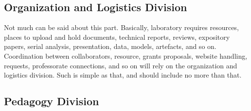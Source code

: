 \documentclass[9pt,a4paper]{article}
\begin{document}
\subsection{Organization and Logistics Division}

Not much can be said about this part. Basically, laboratory requires resources, places to upload and hold documents, technical reports, reviews, expository papers, serial analysis, presentation, data, models, artefacts, and so on. Coordination between collaborators, resource, grants proposals, website handling, requests, professorate connections, and so on will rely on the organization and logistics division. Such is simple as that, and should include no more than that. 

\subsection{Pedagogy Division}
\end{document}
